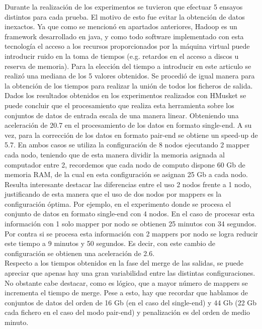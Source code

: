 \documentclass[conference]{IEEEtran}
\begin{document}
Durante la realización de los experimentos se tuvieron que efectuar 5 ensayos distintos para cada prueba. El motivo de esto fue evitar la obtención de datos inexactos. Ya que como se mencionó en apartados anteriores, Hadoop es un framework desarrollado en java, y como todo software implementado con esta tecnología el acceso a los recursos proporcionados por la máquina virtual puede introducir ruido en la toma de tiempos (e.g. retardos en el acceso a discos u reserva de memoria). Para la elección del tiempo a introducir en este articulo se realizó una mediana de los 5 valores obtenidos. Se procedió de igual manera para la obtención de los tiempos para realizar la unión de todos los ficheros de salida.\\

Dados los resultados obtenidos en los experimentos realizados con HMusket se puede concluir que el procesamiento que realiza esta herramienta sobre los conjuntos de datos de entrada escala de una manera linear. Obteniendo una aceleración de 20.7 en el procesamiento de los datos en formato single-end. A su vez, para la corrección de los datos en formato pair-end se obtiene un speed-up de 5.7. En ambos casos se utiliza la configuración de 8 nodos ejecutando 2 mapper cada nodo, teniendo que de esta manera dividir la memoria asignada al computador entre 2, recordemos que cada nodo de computo dispone 60 Gb de memoria RAM, de la cual en esta configuración se asignan 25 Gb a cada nodo. Resulta interesante destacar las diferencias entre el uso 2 nodos frente a 1 nodo, justificando de esta manera que el uso de dos nodos por mappers es la configuración óptima. Por ejemplo, en el experimento donde se procesa el conjunto de datos en formato single-end con 4 nodos. En el caso de procesar esta información con 1 solo mapper por nodo se obtienen 25 minutos con 34 segundos. Por contra si se procesa esta información con 2 mappers por nodo se logra reducir este tiempo a  9 minutos y 50 segundos. Es decir, con este cambio de configuración se obtienen una aceleración de 2.6.\\

Respecto a los tiempos obtenidos en la fase del merge de las salidas, se puede apreciar que apenas hay una gran variabilidad entre las distintas configuraciones. No obstante cabe destacar, como es lógico, que a mayor número de mappers se incrementa el tiempo de merge. Pese a esto, hay que recordar que hablamos de conjuntos de datos del orden de 16 Gb (en el caso del single-end) y 44 Gb (22 Gb cada fichero en el caso del modo pair-end) y penalización es del orden de medio minuto.
\end{document}
